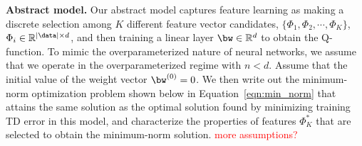 \textbf{Abstract model.} Our abstract model captures feature learning as making a discrete selection among $K$ different feature vector candidates, $\{\Phi_1, \Phi_2, \cdots, \Phi_K\}$, $\Phi_i \in \mathbb{R}^{|\data|\times d}$,
and then training a linear layer $\bw \in \mathbb{R}^{d}$ to obtain the Q-function.
To mimic the overparameterized nature of neural networks, we assume that we operate in the overparameterized regime with $n < d$.
Assume that the initial value of the weight vector $\bw^{(0)} = 0$. We then write out the minimum-norm optimization problem shown below in Equation~\ref{eqn:min_norm} that attains the same solution as the optimal solution found by minimizing training TD error in this model, and characterize the properties of features $\Phi_K^*$ that are selected to obtain the minimum-norm solution. \textcolor{red}{more assumptions?}     
